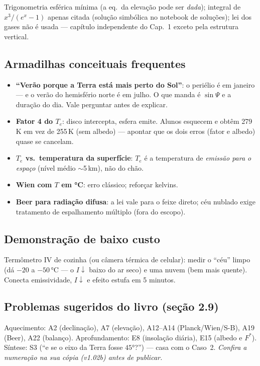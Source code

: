 Trigonometria esférica mínima (a eq.\ da elevação pode ser \emph{dada});
integral de $x^3/(e^x-1)$ apenas citada (solução simbólica no notebook de
soluções); lei dos gases não é usada — capítulo independente do Cap.~1
exceto pela estrutura vertical.

\subsection*{Armadilhas conceituais frequentes}

\begin{itemize}
  \item \textbf{``Verão porque a Terra está mais perto do Sol''}: o periélio
        é em janeiro — e o verão do hemisfério norte é em julho. O que manda
        é $\sin\Psi$ e a duração do dia. Vale perguntar antes de explicar.
  \item \textbf{Fator 4 do $T_e$}: disco intercepta, esfera emite. Alunos
        esquecem e obtêm 279\,K em vez de 255\,K (sem albedo) — apontar que
        os dois erros (fator e albedo) quase se cancelam.
  \item \textbf{$T_e$ vs.\ temperatura da superfície}: $T_e$ é a temperatura
        de \emph{emissão para o espaço} (nível médio $\sim$5\,km), não do
        chão.
  \item \textbf{Wien com $T$ em °C}: erro clássico; reforçar kelvins.
  \item \textbf{Beer para radiação difusa}: a lei vale para o feixe direto;
        céu nublado exige tratamento de espalhamento múltiplo (fora do
        escopo).
\end{itemize}

\subsection*{Demonstração de baixo custo}

Termômetro IV de cozinha (ou câmera térmica de celular): medir o ``céu''
limpo (dá $-20$ a $-50\,°$C — o $I\!\downarrow$ baixo do ar seco) e uma
nuvem (bem mais quente). Conecta emissividade, $I\!\downarrow$ e efeito
estufa em 5 minutos.

\subsection*{Problemas sugeridos do livro (seção 2.9)}

Aquecimento: A2 (declinação), A7 (elevação), A12--A14 (Planck/Wien/S-B),
A19 (Beer), A22 (balanço). Aprofundamento: E8 (insolação diária),
E15 (albedo e $F^*$). Síntese: S3 (``e se o eixo da Terra fosse
$45°$?'') — casa com o Caso~2. \emph{Confira a numeração na sua cópia
(v1.02b) antes de publicar.}

